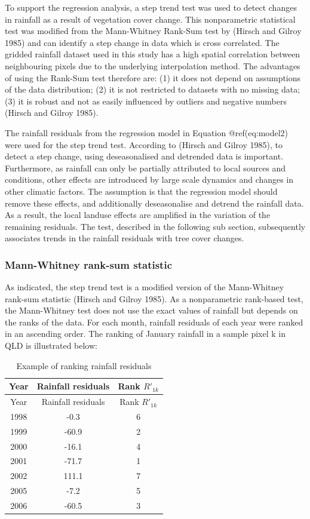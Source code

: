 \documentclass[fleqn,10pt,lineno]{wlpeerj} %
\begin{document}
To support the regression analysis, a step trend test was used to detect
changes in rainfall as a result of vegetation cover change. This
nonparametric statistical test was modified from the Mann-Whitney
Rank-Sum test by (Hirsch and Gilroy 1985) and can identify a step change
in data which is cross correlated. The gridded rainfall dataset used in
this study has a high spatial correlation between neighbouring pixels
due to the underlying interpolation method. The advantages of using the
Rank-Sum test therefore are: (1) it does not depend on assumptions of
the data distribution; (2) it is not restricted to datasets with no
missing data; (3) it is robust and not as easily influenced by outliers
and negative numbers (Hirsch and Gilroy 1985).

The rainfall residuals from the regression model in Equation
@ref(eq:model2) were used for the step trend test. According to (Hirsch
and Gilroy 1985), to detect a step change, using deseasonalised and
detrended data is important. Furthermore, as rainfall can only be
partially attributed to local sources and conditions, other effects are
introduced by large scale dynamics and changes in other climatic
factors. The assumption is that the regression model should remove these
effects, and additionally deseasonalise and detrend the rainfall data.
As a result, the local landuse effects are amplified in the variation of
the remaining residuals. The test, described in the following sub
section, subsequently associates trends in the rainfall residuals with
tree cover changes.

\subsubsection{Mann-Whitney rank-sum
statistic}\label{mann-whitney-rank-sum-statistic}

As indicated, the step trend test is a modified version of the
Mann-Whitney rank-sum statistic (Hirsch and Gilroy 1985). As a
nonparametric rank-based test, the Mann-Whitney test does not use the
exact values of rainfall but depends on the ranks of the data. For each
month, rainfall residuals of each year were ranked in an ascending
order. The ranking of January rainfall in a sample pixel k in QLD is
illustrated below:

\begin{longtable}[]{@{}ccc@{}}
\caption{Example of ranking rainfall residuals}\tabularnewline
\toprule
Year & Rainfall residuals & Rank \(R'_{1k}\)\tabularnewline
\midrule
\endfirsthead
\toprule
Year & Rainfall residuals & Rank \(R'_{1k}\)\tabularnewline
\midrule
\endhead
1998 & -0.3 & 6\tabularnewline
1999 & -60.9 & 2\tabularnewline
2000 & -16.1 & 4\tabularnewline
2001 & -71.7 & 1\tabularnewline
2002 & 111.1 & 7\tabularnewline
2005 & -7.2 & 5\tabularnewline
2006 & -60.5 & 3\tabularnewline
\bottomrule
\end{longtable}
\end{document}
